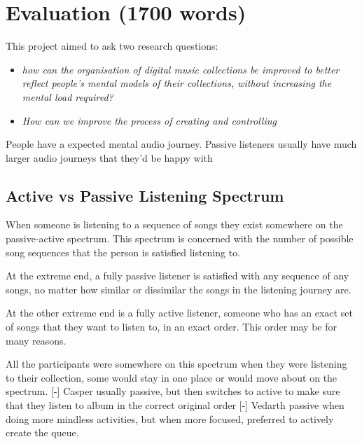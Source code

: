 \chapter{Evaluation (1700 words)}
This project aimed to ask two research questions:\begin{itemize}
    \item \textit{how can the organisation of digital music collections be improved to better reflect people's mental models of their collections, without increasing the mental load required?}
    \item \textit{How can we improve the process of creating and controlling}
\end{itemize}

People have a expected mental audio journey. Passive listeners usually have much larger audio journeys that they'd be happy with

\section{Active vs Passive Listening Spectrum}
When someone is listening to a sequence of songs they exist somewhere on the passive-active spectrum. This spectrum is concerned with the number of possible song sequences that the person is satisfied listening to.

At the extreme end, a fully passive listener is satisfied with any sequence of any songs, no matter how similar or dissimilar the songs in the listening journey are.

At the other extreme end is a fully active listener, someone who has an exact set of songs that they want to listen to, in an exact order. This order may be for many reasons.

All the participants were somewhere on this spectrum when they were listening to their collection, some would stay in one place or would move about on the spectrum.
[-] Casper usually passive, but then switches to active to make sure that they listen to album in the correct original order
[-] Vedarth passive when doing more mindless activities, but when more focused, preferred to actively create the queue.

